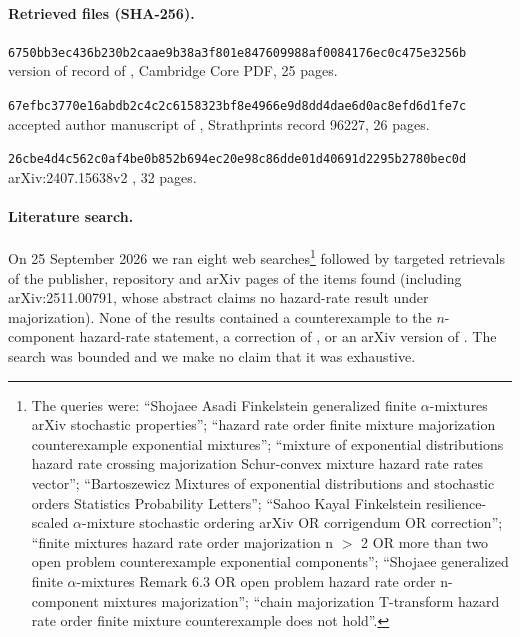 \documentclass[10pt]{article}
\theoremstyle{plain}
\theoremstyle{definition}
\theoremstyle{remark}
\begin{document}
\paragraph{Retrieved files (SHA-256).}
\begin{list}{}{\setlength{\leftmargin}{1em}\setlength{\itemsep}{0pt}\small}
\item \texttt{6750bb3ec436b230b2caae9b38a3f801e847609988af0084176ec0c475e3256b}\\ version of record of \cite{ShojaeeAsadiFinkelstein2022}, Cambridge Core PDF, 25 pages.
\item \texttt{67efbc3770e16abdb2c4c2c6158323bf8e4966e9d8dd4dae6d0ac8efd6d1fe7c}\\ accepted author manuscript of \cite{SahooKayalFinkelstein2026}, Strathprints record 96227, 26 pages.
\item \texttt{26cbe4d4c562c0af4be0b852b694ec20e98c86dde01d40691d2295b2780bec0d}\\ arXiv:2407.15638v2 \cite{GuoYan2024}, 32 pages.
\end{list}

\paragraph{Literature search.} On 25 September 2026 we ran eight web searches\footnote{The queries were: ``Shojaee Asadi Finkelstein generalized finite $\alpha$-mixtures arXiv stochastic properties''; ``hazard rate order finite mixture majorization counterexample exponential mixtures''; ``mixture of exponential distributions hazard rate crossing majorization Schur-convex mixture hazard rate rates vector''; ``Bartoszewicz Mixtures of exponential distributions and stochastic orders Statistics Probability Letters''; ``Sahoo Kayal Finkelstein resilience-scaled $\alpha$-mixture stochastic ordering arXiv OR corrigendum OR correction''; ``finite mixtures hazard rate order majorization n $>$ 2 OR more than two open problem counterexample exponential components''; ``Shojaee generalized finite $\alpha$-mixtures Remark 6.3 OR open problem hazard rate order n-component mixtures majorization''; ``chain majorization T-transform hazard rate order finite mixture counterexample does not hold''.} followed by targeted retrievals of the publisher, repository and arXiv pages of the items found (including arXiv:2511.00791, whose abstract claims no hazard-rate result under majorization). None of the results contained a counterexample to the $n$-component hazard-rate statement, a correction of \cite{SahooKayalFinkelstein2026}, or an arXiv version of \cite{ShojaeeAsadiFinkelstein2022}. The search was bounded and we make no claim that it was exhaustive.
\end{document}
